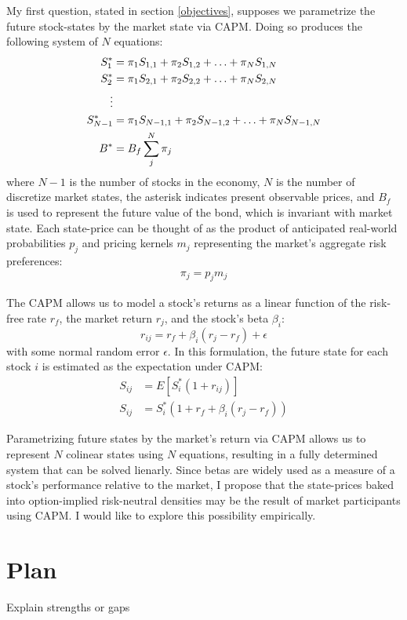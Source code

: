 \documentclass[final,3p,times,authoryear]{elsarticle}
\begin{document}
  My first question, stated in section \ref{objectives}, supposes we parametrize the future stock-states by the market state via CAPM. Doing so produces the following system of $N$ equations:
  \begin{align}
      S^{\ast}_{1} &= \pi_{1} S_{1,1} + \pi_{2} S_{1,2} + \mathellipsis + \pi_{N} S_{1,N}\\
      S^{\ast}_{2} &= \pi_{1} S_{2,1} + \pi_{2} S_{2,2} + \mathellipsis + \pi_{N} S_{2,N}\\
      \vdots\\
      S^{\ast}_{N-1} &= \pi_{1} S_{N-1,1} + \pi_{2} S_{N-1,2} + \mathellipsis + \pi_{N} S_{N-1,N}\\
      B^{\ast} &= B_f  	\displaystyle\sum_{j}^N{\pi_{j}}
  \end{align}
  where $N-1$ is the number of stocks in the economy, $N$ is the number of discretize market states, the asterisk indicates present observable prices, and $B_f$ is used to represent the future value of the bond, which is invariant with market state. Each state-price can be thought of as the product of anticipated real-world probabilities $p_j$ and pricing kernels $m_j$ representing the market's aggregate risk preferences:
  \begin{align}
    \pi_j = p_j m_j
  \end{align}

  The CAPM allows us to model a stock's returns as a linear function of the risk-free rate $r_f$, the market return $r_j$, and the stock's beta $\beta_i$:
  \[r_{ij} = r_f + \beta_i (r_j - r_f) + \epsilon\]
  with some normal random error $\epsilon$. In this formulation, the future state for each stock $i$ is estimated as the expectation under CAPM:
  \begin{align}
    S_{ij} &=  E[S^{\ast}_i (1 + r_{ij})]\\
    S_{ij} &= S^{\ast}_i (1 + r_f + \beta_i (r_j - r_f))
  \end{align}
  
  Parametrizing future states by the market's return via CAPM allows us to represent $N$ colinear states using $N$ equations, resulting in a fully determined system that can be solved lienarly. Since betas are widely used as a measure of a stock's performance relative to the market, I propose that the state-prices baked into option-implied risk-neutral densities may be the result of market participants using CAPM. I would like to explore this possibility empirically.

\section{Plan}
  \label{plan}
  Explain strengths or gaps
\end{document}
